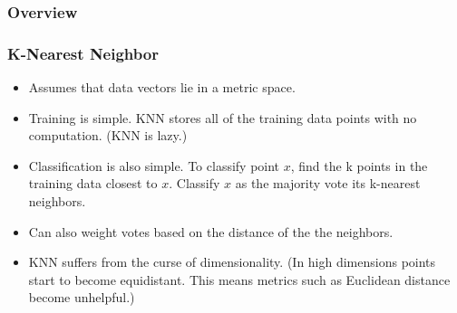 \documentclass[mathserif]{beamer}
\begin{document}
	\subsubsection{Overview}
	\begin{frame}
		\frametitle{K-Nearest Neighbor}
		\begin{itemize}
			\item Assumes that data vectors lie in a metric space.
			\item Training is simple. KNN stores all of the training data points with no computation. (KNN is lazy.) 
			\item Classification is also simple. To classify point \(x\), find the k points in the training data closest to \(x\). Classify \(x\) as the majority vote its k-nearest neighbors.
			\item Can also weight votes based on the distance of the the neighbors.
			\item KNN suffers from the curse of dimensionality. (In high dimensions points start to become equidistant. This means metrics such as Euclidean distance become unhelpful.)
		\end{itemize}
	\end{frame}
	
\end{document}

